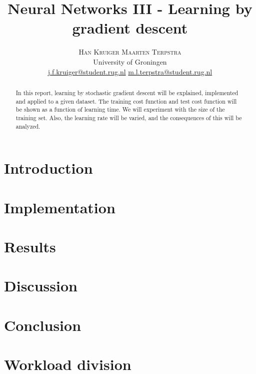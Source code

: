 \documentclass[twoside]{article}
\title{
   \vspace{-15mm}\fontsize{24pt}{10pt}\selectfont\textbf{Neural Networks III - Learning by gradient descent}
} %
\author{
   \large
   \hspace{6mm}\textsc{Han Kruiger} \hspace{12mm} \textsc{Maarten Terpstra}\\[2mm] %
   \normalsize University of Groningen \\ %
   \normalsize \href{mailto:j.f.kruiger@student.rug.nl}{j.f.kruiger@student.rug.nl} \hspace{5mm} \normalsize \href{mailto:m.l.terpstra@student.rug.nl}{m.l.terpstra@student.rug.nl} %
   \vspace{-5mm}
}
\date{}
\begin{document}
\maketitle %

\thispagestyle{fancy} %


\begin{abstract}
   \noindent In this report, learning by stochastic gradient descent will be explained, implemented and applied to a given dataset.
   The training cost function and test cost function will be shown as a function of learning time.
   We will experiment with the size of the training set.
   Also, the learning rate will be varied, and the consequences of this will be analyzed.
\end{abstract}


\begin{multicols}{2} %
\section{Introduction}
\label{sec:intro}


\section{Implementation}
\label{sec:implementation}


\section{Results}
\label{sec:results}


\section{Discussion}
\label{sec:discussion}


\section{Conclusion}
\label{sec:conclusion}


\section{Workload division}
\label{sec:workload}


\end{multicols}
\clearpage
\end{document}
